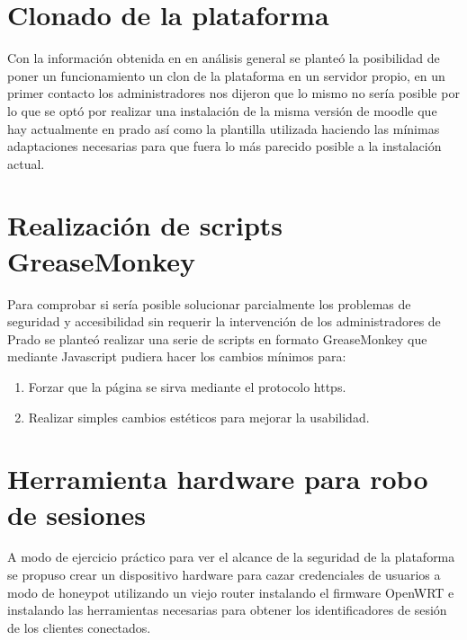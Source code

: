 \section{Clonado de la plataforma}

Con la información obtenida en en análisis general se planteó la posibilidad de poner un funcionamiento un clon de la plataforma en un servidor propio, en un primer contacto los administradores nos dijeron que lo mismo no sería posible por lo que se optó por realizar una instalación de la misma versión de moodle que hay actualmente en prado así como la plantilla utilizada haciendo las mínimas adaptaciones necesarias para que fuera lo más parecido posible a la instalación actual.

\section{Realización de scripts GreaseMonkey}

Para comprobar si sería posible solucionar parcialmente los problemas de seguridad y accesibilidad sin requerir la intervención de los administradores de Prado se planteó realizar una serie de scripts en formato GreaseMonkey que mediante Javascript pudiera hacer los cambios mínimos para:

  		\begin{enumerate}
  			\item Forzar que la página se sirva mediante el protocolo https.
            \item Realizar simples cambios estéticos para mejorar la usabilidad.
        \end{enumerate}

\section{Herramienta hardware para robo de sesiones}

A modo de ejercicio práctico para ver el alcance de la seguridad de la plataforma se propuso crear un dispositivo hardware para cazar credenciales de usuarios a modo de honeypot utilizando un viejo router instalando el firmware OpenWRT \cite{openwrt} e instalando las herramientas necesarias para obtener los identificadores de sesión de los clientes conectados.



